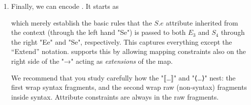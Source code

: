 \documentclass[11pt]{article} %
\begin{document}
\begin{enumerate}
\item Finally, we can encode . It starts as
  which merely establish  the basic rules that the $S.e$ attribute inherited from the context (through
  the left hand "Se") is passed to both $E_3$ and $S_4$ through the right "Ee" and "Se",
  respectively. This captures everything except the ``Extend'' notation. \HAX supports this by
  allowing mapping constraints also on the right side of the "→" acting as \emph{extensions} of the
  map.
  We recommend that you study carefully how the "⟦…⟧" and "⟨…⟩" nest: the first wrap syntax fragments, and the
  second wrap raw (non-syntax) fragments inside syntax. Attribute constraints are always in the raw fragments.

\end{enumerate}
\end{document}
